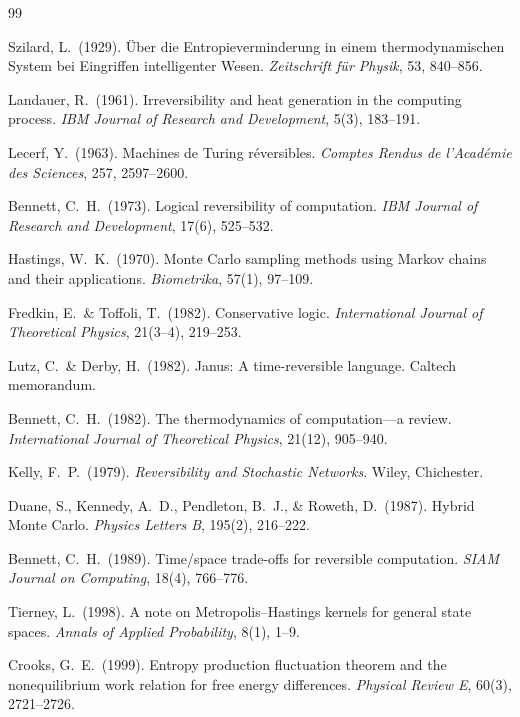 \documentclass[11pt,a4paper]{article}
\begin{document}
\begin{thebibliography}{99}

Szilard, L.\ (1929). \"{U}ber die Entropieverminderung in einem thermodynamischen System bei
Eingriffen intelligenter Wesen. \textit{Zeitschrift f\"{u}r Physik}, 53, 840--856.

Landauer, R.\ (1961). Irreversibility and heat generation in the computing process.
\textit{IBM Journal of Research and Development}, 5(3), 183--191.

Lecerf, Y.\ (1963). Machines de Turing r\'{e}versibles. \textit{Comptes Rendus de l'Acad\'{e}mie
des Sciences}, 257, 2597--2600.

Bennett, C.\ H.\ (1973). Logical reversibility of computation.
\textit{IBM Journal of Research and Development}, 17(6), 525--532.

Hastings, W.\ K.\ (1970). Monte Carlo sampling methods using Markov chains and their applications.
\textit{Biometrika}, 57(1), 97--109.

Fredkin, E.\ \& Toffoli, T.\ (1982). Conservative logic.
\textit{International Journal of Theoretical Physics}, 21(3--4), 219--253.

Lutz, C.\ \& Derby, H.\ (1982). Janus: A time-reversible language. Caltech memorandum.

Bennett, C.\ H.\ (1982). The thermodynamics of computation---a review.
\textit{International Journal of Theoretical Physics}, 21(12), 905--940.

Kelly, F.\ P.\ (1979). \textit{Reversibility and Stochastic Networks}. Wiley, Chichester.

Duane, S., Kennedy, A.\ D., Pendleton, B.\ J., \& Roweth, D.\ (1987). Hybrid Monte Carlo.
\textit{Physics Letters B}, 195(2), 216--222.

Bennett, C.\ H.\ (1989). Time/space trade-offs for reversible computation.
\textit{SIAM Journal on Computing}, 18(4), 766--776.

Tierney, L.\ (1998). A note on Metropolis--Hastings kernels for general state spaces.
\textit{Annals of Applied Probability}, 8(1), 1--9.

Crooks, G.\ E.\ (1999). Entropy production fluctuation theorem and the nonequilibrium work
relation for free energy differences. \textit{Physical Review E}, 60(3), 2721--2726.


\end{thebibliography}
\end{document}
